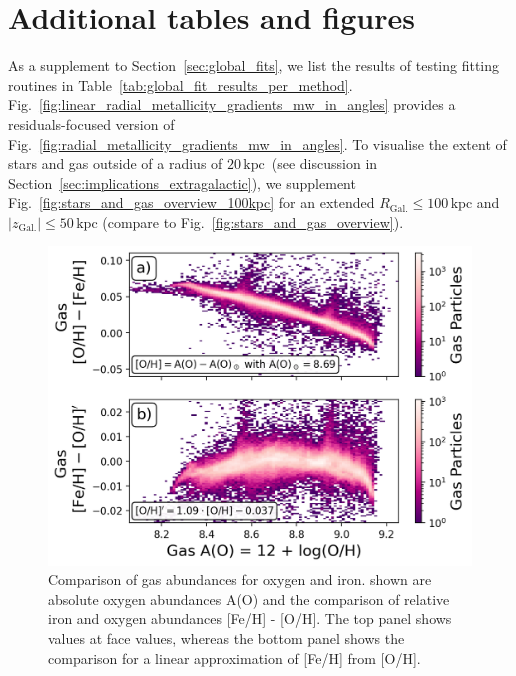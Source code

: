 \documentclass[twocolumn,apj,numberedappendix,appendixfloats]{openjournal}
\newcommand{\nihaoRmax}{$20\,\mathrm{kpc}$}
\begin{document}



\appendix

\section{Additional tables and figures} \label{sec:appendix_different_fits}

As a supplement to Section~\ref{sec:global_fits}, we list the results of testing fitting routines in Table~\ref{tab:global_fit_results_per_method}. Fig.~\ref{fig:linear_radial_metallicity_gradients_mw_in_angles} provides a residuals-focused version of Fig.~\ref{fig:radial_metallicity_gradients_mw_in_angles}. To visualise the extent of stars and gas outside of a radius of \nihaoRmax\ (see discussion in Section~\ref{sec:implications_extragalactic}), we supplement Fig.~\ref{fig:stars_and_gas_overview_100kpc} for an extended $R_\mathrm{Gal.} \leq 100\,\mathrm{kpc}$ and $\vert z_\mathrm{Gal.} \vert \leq 50\,\mathrm{kpc}$ (compare to Fig.~\ref{fig:stars_and_gas_overview}). 



\begin{figure}
    \centering
    \includegraphics[width=0.5\columnwidth]{figures/fe_h_vs_a_o_gas}
    \caption{Comparison of gas abundances for oxygen and iron. shown are absolute oxygen abundances A(O) and the comparison of relative iron and oxygen abundances [Fe/H] - [O/H]. The top panel shows values at face values, whereas the bottom panel shows the comparison for a linear approximation of [Fe/H] from [O/H].}    \label{fig:fe_h_vs_a_o_gas}
\end{figure}
\end{document}
